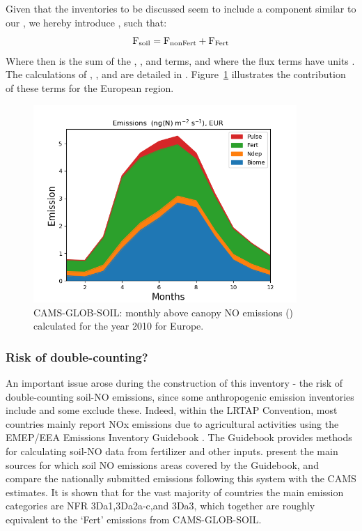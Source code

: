 Given that the inventories to be discussed seem to include a
component similar to our \Ff, we hereby introduce \Fn, such that:
\begin{equation}
  \mbox{F}_{\scriptsize \mbox{soil}} = \mbox{F}_{\scriptsize \mbox{nonFert}}  + \mbox{F}_{\scriptsize \mbox{Fert}}
  \label{eqn:Fn}
\end{equation}
Where \Fn then is the sum of the \Fb, \Fd, and \Fp terms, and where the
flux terms have units \ngN. The calculations of \Fb, \Ff, \Fd and \Fp
are detailed in \citet{SimpsonDarras:2021}.
Figure~\ref{fig:SIemis} illustrates the contribution of these terms for
the European region.

\begin{figure}
  \centering
   \includegraphics*[width=10cm]{FIGS_UPDATES/PlotRegionalTimeSeriesMonthly_EUR_YLnSMI_Mar2021.png}
  \parbox{10cm}{
  \caption{CAMS-GLOB-SOIL: monthly above canopy NO emissions (\ngN)  calculated for the year 2010
     for Europe.
    \label{fig:SIemis}}
  }
\end{figure}


\subsubsection{Risk of double-counting?}

An important issue arose during the construction  of this inventory - the risk of double-counting
soil-NO emissions, since some anthropogenic  emission inventories include and 
some exclude these.
Indeed, within the LRTAP Convention,
most countries mainly report NOx emissions due to agricultural activities
using the EMEP/EEA Emissions Inventory Guidebook
\citep{Guidebook2019:3D}. The Guidebook provides methods for calculating
soil-NO data from fertilizer and other inputs.
\citet{SimpsonDarras:2021} present the main sources for which
 soil NO emissions areas covered by the Guidebook, and
compare the nationally
submitted emissions following this system with the CAMS estimates.
It is shown that for the vast majority of countries
the main emission categories are NFR  3Da1,3Da2a-c,and
3Da3, which together are roughly equivalent to
the `Fert' emissions from CAMS-GLOB-SOIL.

